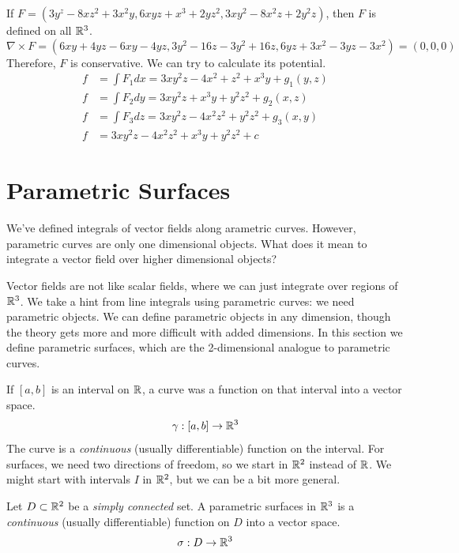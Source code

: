 \documentclass[fleqn,letterpaper]{report}
\begin{document}
\begin{example}
If $F = (3y^z - 8xz^2 + 3x^2 y, 6xyz + x^3 + 2yz^2, 3xy^2 -
8x^2z + 2y^2z)$, then $F$ is defined on all $\mathbb{R}^3$.
\begin{equation*}
\nabla \times F = (6xy+4yz-6xy-4yz, 3y^2 -16z -3y^2 + 16z, 6yz
+ 3x^2 - 3yz - 3x^2) = (0,0,0)
\end{equation*}
Therefore, $F$ is conservative. We can try to calculate its
potential.
\begin{align*}
f & = \int F_1 dx = 3xy^2 z - 4x^2 + z^2 + x^3 y + g_1(y,z) \\
f & = \int F_2 dy = 3xy^2 z + x^3 y + y^2 z^2 + g_2(x,z) \\
f & = \int F_3 dz = 3xy^2 z - 4x^2 z^2 + y^2 z^2 + g_3 (x,y)
\\
f & = 3xy^2 z - 4x^2 z^2 + x^3 y + y^2 z^2 + c
\end{align*}
\end{example}

\section{Parametric Surfaces}
\label{parametric-surfaces}

We've defined integrals of vector fields along
arametric curves. However, parametric curves are only one dimensional
objects. What does it mean to integrate a vector field over higher
dimensional objects? 

Vector fields are not like scalar fields, where we can just
integrate over regions of $\mathbb{R}^3$. We take a hint from line
integrals using parametric curves: we need parametric objects.
We can define parametric objects in any dimension, though the
theory gets more and more difficult with added dimensions. In
this section we define parametric surfaces, which are the
2-dimensional analogue to parametric curves.

If $[a,b]$ is an interval on
$\mathbb{R}$, a curve was a function on that interval into a vector
space.
\begin{equation*}
\gamma: [a,b] \rightarrow \mathbb{R}^3
\end{equation*}
The curve is a \emph{continuous} (usually differentiable)
function on the interval. For surfaces, we need two
directions of freedom, so we start in $\mathbb{R}^2$ instead of
$\mathbb{R}$. We might start with intervals $I$ in $\mathbb{R}^2$, but we
can be a bit more general. 

\begin{defn}
Let $D \subset \mathbb{R}^2$ be a \emph{simply connected} set. A
parametric surfaces in $\mathbb{R}^3$ is a \emph{continuous} (usually
differentiable) function on $D$ into a vector space.
\begin{equation*}
\sigma: D \rightarrow \mathbb{R}^3
\end{equation*}
\end{defn}
\end{document}
